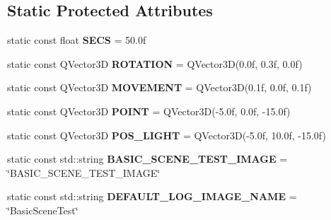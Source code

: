 \subsection*{Static Protected Attributes}
\begin{DoxyCompactItemize}
\item 
\mbox{\label{class_unit_test_1_1_c_basic_scene_test_a2b22f2923a353120b4ca5aa02a4c11b8}} 
static const float {\bfseries S\+E\+CS} = 50.\+0f
\item 
\mbox{\label{class_unit_test_1_1_c_basic_scene_test_a12ae681f7293ecfd5f7ccc670349dc79}} 
static const Q\+Vector3D {\bfseries R\+O\+T\+A\+T\+I\+ON} = Q\+Vector3D(0.\+0f, 0.\+3f, 0.\+0f)
\item 
\mbox{\label{class_unit_test_1_1_c_basic_scene_test_ae53cc2abb708148ee93194ada7b0db96}} 
static const Q\+Vector3D {\bfseries M\+O\+V\+E\+M\+E\+NT} = Q\+Vector3D(0.\+1f, 0.\+0f, 0.\+1f)
\item 
\mbox{\label{class_unit_test_1_1_c_basic_scene_test_a58708d7aaa9ff202427ba0a2fc39b100}} 
static const Q\+Vector3D {\bfseries P\+O\+I\+NT} = Q\+Vector3D(-\/5.\+0f, 0.\+0f, -\/15.\+0f)
\item 
\mbox{\label{class_unit_test_1_1_c_basic_scene_test_ac76a84f1d8512f4ba952c8428192b900}} 
static const Q\+Vector3D {\bfseries P\+O\+S\+\_\+\+L\+I\+G\+HT} = Q\+Vector3D(-\/5.\+0f, 10.\+0f, -\/15.\+0f)
\item 
\mbox{\label{class_unit_test_1_1_c_basic_scene_test_a39aaee1980a98e50727562bf869334be}} 
static const std\+::string {\bfseries B\+A\+S\+I\+C\+\_\+\+S\+C\+E\+N\+E\+\_\+\+T\+E\+S\+T\+\_\+\+I\+M\+A\+GE} = \char`\"{}B\+A\+S\+I\+C\+\_\+\+S\+C\+E\+N\+E\+\_\+\+T\+E\+S\+T\+\_\+\+I\+M\+A\+GE\char`\"{}
\item 
\mbox{\label{class_unit_test_1_1_c_basic_scene_test_a359b69dc59c6748193e89fa27f0c264d}} 
static const std\+::string {\bfseries D\+E\+F\+A\+U\+L\+T\+\_\+\+L\+O\+G\+\_\+\+I\+M\+A\+G\+E\+\_\+\+N\+A\+ME} = \char`\"{}Basic\+Scene\+Test\char`\"{}
\end{DoxyCompactItemize}


